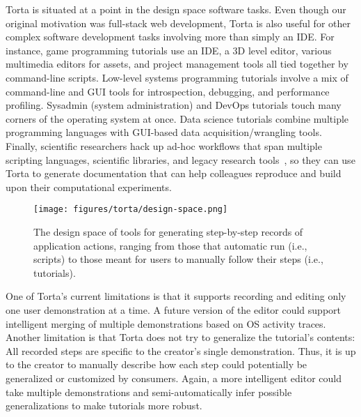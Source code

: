 Torta is situated at a point in the design space  software tasks.
%
%
Even though our original motivation was full-stack
web development, Torta is also useful for other complex software
development tasks involving more than simply an IDE. For instance,
game programming tutorials use an IDE, a 3D level editor, various
multimedia editors for assets, and project management tools all tied
together by command-line scripts. Low-level systems programming
tutorials involve a mix of command-line and GUI tools for introspection,
debugging, and performance profiling. Sysadmin (system administration)
and DevOps tutorials touch many corners of the operating system at once.
Data science tutorials combine multiple programming languages with
GUI-based data acquisition/wrangling tools. Finally, scientific
researchers hack up ad-hoc workflows that span multiple scripting
languages, scientific libraries, and legacy research
tools~\cite{GuoPhD2012}, so they can use Torta to generate documentation
that can help colleagues reproduce and build upon their computational
experiments.
%


\begin{figure}[h!]
\texttt{[image: figures/torta/design-space.png]}

\nocite{Bolin2005} %
\caption{The design space of tools for generating step-by-step records
of application actions, ranging from those that automatic run (i.e.,
scripts) to those meant for users to manually follow their steps (i.e.,
tutorials).}

\vspace{-0.5em} %
\label{fig:design-space}
\end{figure}


One of Torta's current limitations is that it supports recording and
editing only one user demonstration at a time. A future version of the
editor could support intelligent merging of multiple demonstrations
based on OS activity traces. Another limitation is that Torta does not
try to generalize the tutorial's contents: All recorded steps are
specific to the creator's single demonstration. Thus, it is up to the
creator to manually describe how each step could potentially be
generalized or customized by consumers. Again, a more intelligent editor
could take multiple demonstrations and semi-automatically infer possible
generalizations to make tutorials more robust.

